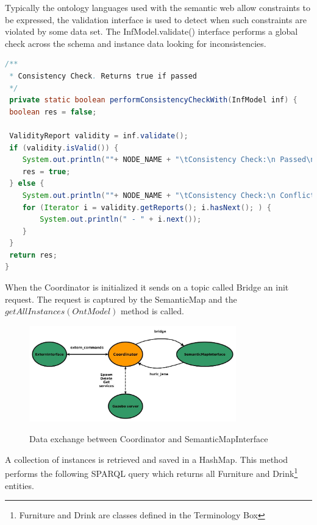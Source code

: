 Typically the ontology languages used with the semantic web allow constraints to be expressed, the validation interface is used to detect when such constraints are violated by some data set. The InfModel.validate() interface performs a global check across the schema and instance data looking for inconsistencies. 


\begin{lstlisting}[language=Java]
/** 
 * Consistency Check. Returns true if passed
 */
 private static boolean performConsistencyCheckWith(InfModel inf) {
 boolean res = false; 

 ValidityReport validity = inf.validate();
 if (validity.isValid()) {
	System.out.println(""+ NODE_NAME + "\tConsistency Check:\n Passed\n");
	res = true;
 } else {
	System.out.println(""+ NODE_NAME + "\tConsistency Check:\n Conflicts\n");
	for (Iterator i = validity.getReports(); i.hasNext(); ) {
	    System.out.println(" - " + i.next());
	}
 }
 return res;
}
\end{lstlisting}

When the Coordinator is initialized it sends on a topic called Bridge an init request. The request is captured by the SemanticMap and the $getAllInstances(OntModel)$ method is called. 

\begin{figure}[H]
\centering
\includegraphics[width=0.8\textwidth]{imgs/topics1.jpg}
\label{fig:actions}
\caption{Data exchange between Coordinator and SemanticMapInterface}
\end{figure}


A collection of instances is retrieved and saved in a HashMap. This method performs the following SPARQL query which returns all Furniture and Drink\footnote{Furniture and Drink are classes defined in the Terminology Box} entities. 

